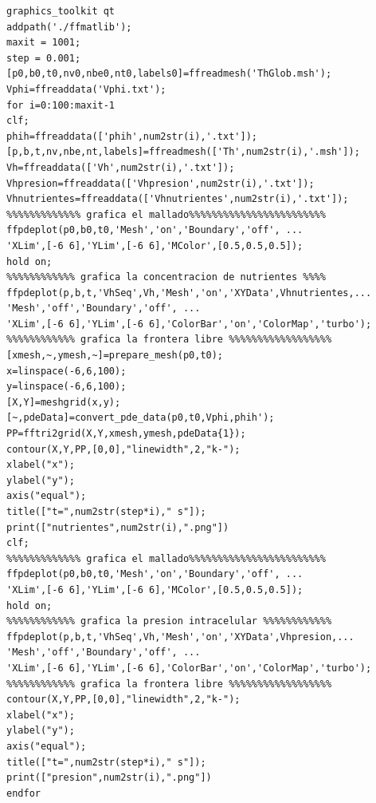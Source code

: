 \begin{lstlisting}
graphics_toolkit qt
addpath('./ffmatlib');
maxit = 1001;
step = 0.001;
[p0,b0,t0,nv0,nbe0,nt0,labels0]=ffreadmesh('ThGlob.msh');
Vphi=ffreaddata('Vphi.txt');
for i=0:100:maxit-1
clf;
phih=ffreaddata(['phih',num2str(i),'.txt']);
[p,b,t,nv,nbe,nt,labels]=ffreadmesh(['Th',num2str(i),'.msh']);
Vh=ffreaddata(['Vh',num2str(i),'.txt']);
Vhpresion=ffreaddata(['Vhpresion',num2str(i),'.txt']);
Vhnutrientes=ffreaddata(['Vhnutrientes',num2str(i),'.txt']);
%%%%%%%%%%%%% grafica el mallado%%%%%%%%%%%%%%%%%%%%%%%%
ffpdeplot(p0,b0,t0,'Mesh','on','Boundary','off', ...
'XLim',[-6 6],'YLim',[-6 6],'MColor',[0.5,0.5,0.5]);
hold on;
%%%%%%%%%%%% grafica la concentracion de nutrientes %%%%
ffpdeplot(p,b,t,'VhSeq',Vh,'Mesh','on','XYData',Vhnutrientes,...
'Mesh','off','Boundary','off', ...
'XLim',[-6 6],'YLim',[-6 6],'ColorBar','on','ColorMap','turbo');
%%%%%%%%%%%% grafica la frontera libre %%%%%%%%%%%%%%%%%%
[xmesh,~,ymesh,~]=prepare_mesh(p0,t0);
x=linspace(-6,6,100);
y=linspace(-6,6,100);
[X,Y]=meshgrid(x,y);
[~,pdeData]=convert_pde_data(p0,t0,Vphi,phih');
PP=fftri2grid(X,Y,xmesh,ymesh,pdeData{1});
contour(X,Y,PP,[0,0],"linewidth",2,"k-");
xlabel("x");
ylabel("y");
axis("equal");
title(["t=",num2str(step*i)," s"]);
print(["nutrientes",num2str(i),".png"])
clf;
%%%%%%%%%%%%% grafica el mallado%%%%%%%%%%%%%%%%%%%%%%%%
ffpdeplot(p0,b0,t0,'Mesh','on','Boundary','off', ...
'XLim',[-6 6],'YLim',[-6 6],'MColor',[0.5,0.5,0.5]);
hold on;
%%%%%%%%%%%% grafica la presion intracelular %%%%%%%%%%%%
ffpdeplot(p,b,t,'VhSeq',Vh,'Mesh','on','XYData',Vhpresion,...
'Mesh','off','Boundary','off', ...
'XLim',[-6 6],'YLim',[-6 6],'ColorBar','on','ColorMap','turbo');
%%%%%%%%%%%% grafica la frontera libre %%%%%%%%%%%%%%%%%%
contour(X,Y,PP,[0,0],"linewidth",2,"k-");
xlabel("x");
ylabel("y");
axis("equal");
title(["t=",num2str(step*i)," s"]);
print(["presion",num2str(i),".png"])
endfor
\end{lstlisting}
